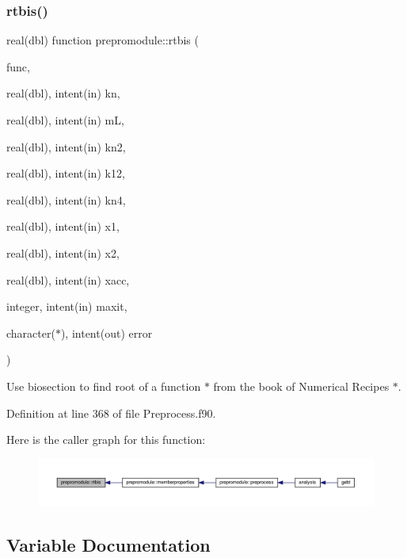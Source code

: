 \subsubsection{\texorpdfstring{rtbis()}{rtbis()}}
{\footnotesize\ttfamily real(dbl) function prepromodule\+::rtbis (\begin{DoxyParamCaption}\item[{}]{func,  }\item[{real(dbl), intent(in)}]{kn,  }\item[{real(dbl), intent(in)}]{mL,  }\item[{real(dbl), intent(in)}]{kn2,  }\item[{real(dbl), intent(in)}]{k12,  }\item[{real(dbl), intent(in)}]{kn4,  }\item[{real(dbl), intent(in)}]{x1,  }\item[{real(dbl), intent(in)}]{x2,  }\item[{real(dbl), intent(in)}]{xacc,  }\item[{integer, intent(in)}]{maxit,  }\item[{character($\ast$), intent(out)}]{error }\end{DoxyParamCaption})\hspace{0.3cm}{\ttfamily [private]}}



Use biosection to find root of a function $\ast$ from the book of Numerical Recipes $\ast$. 



Definition at line 368 of file Preprocess.\+f90.

Here is the caller graph for this function\+:\nopagebreak
\begin{figure}[H]
\begin{center}
\leavevmode
\includegraphics[width=350pt]{namespaceprepromodule_a078487e47a4a49a0b7f7c94be9f2c8f9_icgraph}
\end{center}
\end{figure}


\subsection{Variable Documentation}
\mbox{\label{namespaceprepromodule_a41d66ef3ffc050f01bc1763c62c6f3e1}} 
